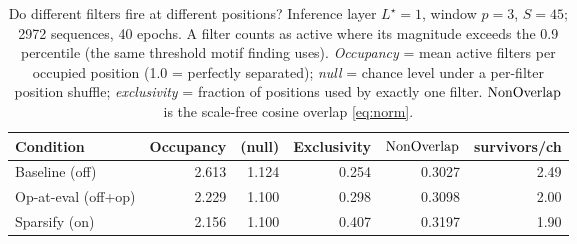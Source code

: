 \begin{table}[h]\centering
\caption{Do different filters fire at different positions? Inference layer $L^\star=1$, window $p=3$, $S=45$; 2972 sequences, 40 epochs. A filter counts as active where its magnitude exceeds the 0.9 percentile (the same threshold motif finding uses). \emph{Occupancy} = mean active filters per occupied position (1.0 = perfectly separated); \emph{null} = chance level under a per-filter position shuffle; \emph{exclusivity} = fraction of positions used by exactly one filter. $\mathrm{NonOverlap}$ is the scale-free cosine overlap \eqref{eq:norm}.}\label{tab:exp1}
\begin{tabular}{lrrrrr}\toprule
Condition & Occupancy & (null) & Exclusivity & $\mathrm{NonOverlap}$ & survivors/ch \\ \midrule
Baseline (off) & 2.613 & 1.124 & 0.254 & 0.3027 & 2.49 \\
Op-at-eval (off+op) & 2.229 & 1.100 & 0.298 & 0.3098 & 2.00 \\
Sparsify (on) & 2.156 & 1.100 & 0.407 & 0.3197 & 1.90 \\
\bottomrule\end{tabular}\end{table}
